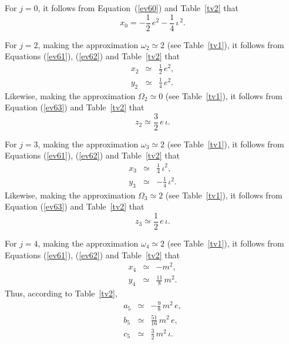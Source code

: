  For $j=0$, it follows from Equation~(\ref{ev60}) and Table~\ref{tv2} that
 \begin{equation}
 x_0 = -\frac{1}{2}\,e^2 -\frac{1}{4}\,\iota^{\,2}.
 \end{equation}
 
 For $j=2$, making the approximation $\omega_2\simeq 2$ (see Table~\ref{tv1}), it follows from Equations (\ref{ev61}), (\ref{ev62})
 and Table~\ref{tv2} that
 \begin{eqnarray}
 x_2&\simeq & \frac{1}{2}\,e^2,\\[0.5ex]
 y_2 &\simeq & \frac{1}{4}\,e^2.
 \end{eqnarray}
 Likewise, making the approximation $\Omega_2\simeq 0$  (see Table~\ref{tv1}), it follows from Equation (\ref{ev63})
  and Table~\ref{tv2} that
 \begin{equation}
 z_2\simeq  \frac{3}{2}\,e\,\iota.
 \end{equation}
 
 For $j=3$, making the approximation $\omega_3\simeq 2$ (see Table~\ref{tv1}), it follows from Equations  (\ref{ev61}), (\ref{ev62})
 and Table~\ref{tv2} that
 \begin{eqnarray}
 x_3&\simeq & \frac{1}{4}\,\iota^2,\\[0.5ex]
 y_3 &\simeq & -\frac{1}{4}\,\iota^2.
 \end{eqnarray}
 Likewise, making the approximation $\Omega_3\simeq 2$  (see Table~\ref{tv1}), it follows from Equation (\ref{ev63})
  and Table~\ref{tv2} that
 \begin{equation}
 z_3\simeq  \frac{1}{2}\,e\,\iota.
 \end{equation}
 
 For $j=4$, making the approximation $\omega_4\simeq 2$ (see Table~\ref{tv1}), it follows from Equations (\ref{ev61}), (\ref{ev62})
 and Table~\ref{tv2} that
 \begin{eqnarray}
 x_4&\simeq &-m^2,\\[0.5ex]
 y_4 &\simeq & \frac{11}{8}\,m^2.
 \end{eqnarray}
 Thus, according to Table~\ref{tv2}, 
 \begin{eqnarray}
 a_5 &\simeq&-\frac{9}{8}\,m^2\,e,\label{ev76}\\[0.5ex]
 b_5 &\simeq&\frac{51}{16}\,m^2\,e,\label{ev77}\\[0.5ex]
 c_5 &\simeq & \frac{3}{2}\,m^2\,\iota.\label{ev78}
 \end{eqnarray}
 
